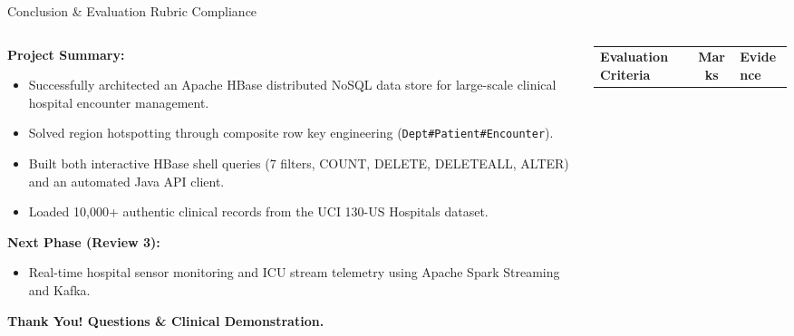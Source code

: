 \documentclass[aspectratio=169]{beamer}
\begin{document}
\begin{frame}[shrink=3]{Conclusion \& Evaluation Rubric Compliance}
    \begin{columns}[T]
        \begin{column}{0.45\textwidth}
            \textbf{\textcolor{NavyBlue}{Project Summary:}}
            \begin{itemize}\scriptsize
                \item Successfully architected an Apache HBase distributed NoSQL data store for large-scale clinical hospital encounter management.
                \item Solved region hotspotting through composite row key engineering (\texttt{Dept\#Patient\#Encounter}).
                \item Built both interactive HBase shell queries (7 filters, COUNT, DELETE, DELETEALL, ALTER) and an automated Java API client.
                \item Loaded 10,000+ authentic clinical records from the UCI 130-US Hospitals dataset.
            \end{itemize}
            \vspace{0.15cm}
            \textbf{\textcolor{NavyBlue}{Next Phase (Review 3):}}
            \begin{itemize}\scriptsize
                \item Real-time hospital sensor monitoring and ICU stream telemetry using Apache Spark Streaming and Kafka.
            \end{itemize}
            \vspace{0.2cm}
            \centering
            \textbf{\textcolor{AmritaMaroon}{Thank You! Questions \& Clinical Demonstration.}}
        \end{column}
        \begin{column}{0.52\textwidth}
            \vspace{-0.15cm}
            {\fontsize{6}{7.5}\selectfont
            \begin{table}
                \centering
                \renewcommand{\arraystretch}{1.15}
                \begin{tabular}{>{\raggedright\arraybackslash}p{2.8cm}cp{3.2cm}}
                    \toprule
                    \textbf{Evaluation Criteria} & \textbf{Marks} & \textbf{Evidence} \\

\end{tabular}
\end{table}}
\end{column}
\end{columns}
\end{frame}
\end{document}
